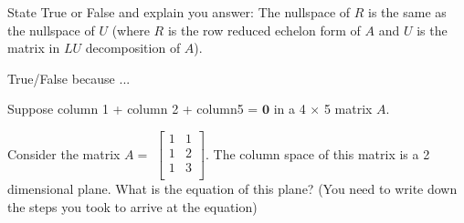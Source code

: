\documentclass[solution,addpoints,12pt]{exam}
\begin{document}
\begin{questions}


\question[\half] State True or False and explain you answer: The nullspace of $R$ is the same as the nullspace of $U$ (where $R$ is the row reduced echelon form of $A$ and $U$ is the matrix in $LU$ decomposition of $A$). 
\begin{solution}
True/False because ...
\end{solution}

\question [1] Suppose column 1 + column 2 + column5 = $\mathbf{0}$ in a 4 $\times$ 5 matrix $A$. 

\question[2] Consider the matrix $A=$
$\begin{bmatrix}
1&1\\
1&2\\
1&3\\
\end{bmatrix}$. The column space of this matrix is a 2 dimensional plane. What is the equation of this plane? (You need to write down the steps you took to arrive at the equation)
\begin{solution}


\end{solution}
\end{questions}
\end{document}
